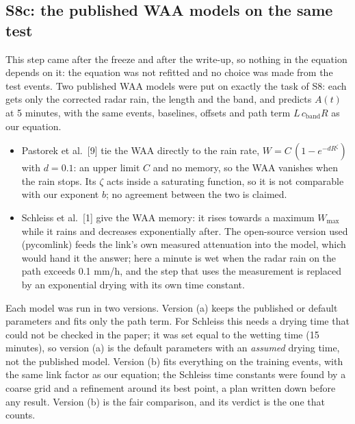 \documentclass[11pt,a4paper]{article}
\begin{document}
\subsection{S8c: the published WAA models on the same test}
\label{sec:s8c}

This step came after the freeze and after the write-up, so nothing in the equation depends on it: the equation was
not refitted and no choice was made from the test events. Two published WAA models were put on exactly the task of
S8: each gets only the corrected radar rain, the length and the band, and predicts $A(t)$ at 5 minutes, with the same
events, baselines, offsets and path term $L\,c_{\mathrm{band}}R$ as our equation.
\begin{itemize}
\item Pastorek et al.\ [9] tie the WAA directly to the rain rate, $W = C\,(1 - e^{-d R^{\zeta}})$ with $d = 0.1$: an
upper limit $C$ and no memory, so the WAA vanishes when the rain stops. Its $\zeta$ acts inside a saturating function,
so it is not comparable with our exponent $b$; no agreement between the two is claimed.
\item Schleiss et al.\ [1] give the WAA memory: it rises towards a maximum $W_{\max}$ while it rains and decreases
exponentially after. The open-source version used (pycomlink) feeds the link's own measured attenuation into the
model, which would hand it the answer; here a minute is wet when the radar rain on the path exceeds 0.1 mm/h, and the
step that uses the measurement is replaced by an exponential drying with its own time constant.
\end{itemize}
Each model was run in two versions. Version (a) keeps the published or default parameters and fits only the path
term. For Schleiss this needs a drying time that could not be checked in the paper; it was set equal to the wetting
time (15 minutes), so version (a) is the default parameters with an \emph{assumed} drying time, not the published
model. Version (b) fits everything on the training events, with the same link factor as our equation; the Schleiss
time constants were found by a coarse grid and a refinement around its best point, a plan written down before any
result. Version (b) is the fair comparison, and its verdict is the one that counts.
\end{document}
